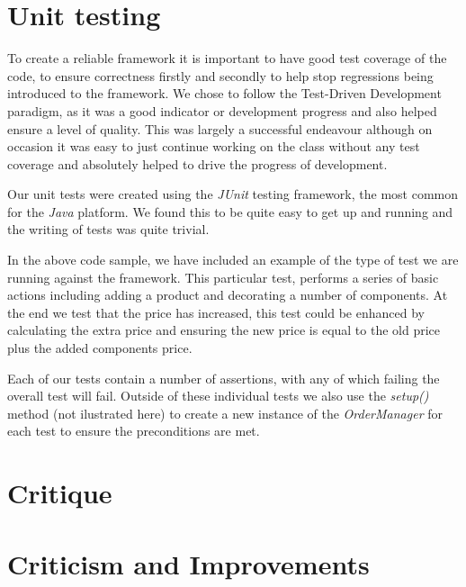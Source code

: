 \documentclass[pdftex,11pt,a4paper]{article}
\begin{document}
\pagebreak

\section{Unit testing}

To create a reliable framework it is important to have good test coverage of the code, to ensure correctness firstly and secondly to help stop regressions being introduced to the framework. We chose to follow the Test-Driven Development paradigm, as it was a good indicator or development progress and also helped ensure a level of quality. This was largely a successful endeavour although on occasion it was easy to just continue working on the class without any test coverage and absolutely helped to drive the progress of development.

Our unit tests were created using the \emph{JUnit} testing framework\cite{website:junit}, the most common for the \emph{Java} platform. We found this to be quite easy to get up and running and the writing of tests was quite trivial.



In the above code sample, we have included an example of the type of test we are running against the framework. This particular test, performs a series of basic actions including adding a product and decorating a number of components. At the end we test that the price has increased, this test could be enhanced by calculating the extra price and ensuring the new price is equal to the old price plus the added components price.

Each of our tests contain a number of assertions, with any of which failing the overall test will fail. Outside of these individual tests we also use the \emph{setup()} method (not ilustrated here) to create a new instance of the \emph{OrderManager} for each test to ensure the preconditions are met.
\pagebreak
\section{Critique}

\section{Criticism and Improvements}
\end{document}
